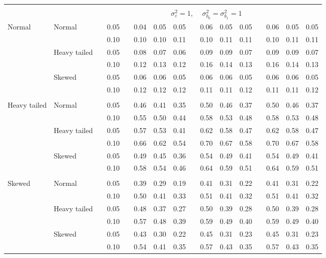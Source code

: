 \documentclass{article} %
\begin{document}
\begin{table}[ht]
\begin{scriptsize}
\begin{center}
\begin{tabular}{ll p{.1cm} c p{.1cm} rrr p{.1cm} rrr p{.1cm} rrr}
&&&&&&&&&&&&&&&\\
& && && \multicolumn{9}{c}{$\sigma_{\varepsilon}^2 = 1$, \ \ $\sigma_{b_0}^2 = \sigma_{b_1}^2 = 1$} \\ \cline{6-16}
\rowcolor{gray!20}Normal       & Normal       && 0.05 &&   0.04 & 0.05 & 0.05 && 0.06 & 0.05 & 0.05 && 0.06 & 0.05 & 0.05 \\ 
\rowcolor{gray!20}             &              && 0.10 &&   0.10 & 0.10 & 0.11 && 0.10 & 0.11 & 0.11 && 0.10 & 0.11 & 0.11 \\ 
\rowcolor{gray!20}             & Heavy tailed && 0.05 &&   0.08 & 0.07 & 0.06 && 0.09 & 0.09 & 0.07 && 0.09 & 0.09 & 0.07 \\ 
\rowcolor{gray!20}             &              && 0.10 &&   0.12 & 0.13 & 0.12 && 0.16 & 0.14 & 0.13 && 0.16 & 0.14 & 0.13 \\ 
\rowcolor{gray!20}             & Skewed       && 0.05 &&   0.06 & 0.06 & 0.05 && 0.06 & 0.06 & 0.05 && 0.06 & 0.06 & 0.05 \\ 
\rowcolor{gray!20}             &              && 0.10 &&   0.12 & 0.12 & 0.12 && 0.11 & 0.11 & 0.12 && 0.11 & 0.11 & 0.12 \\ 
             &&&&&&&&&&&&&&&\\
Heavy tailed & Normal       && 0.05 &&   0.46 & 0.41 & 0.35 && 0.50 & 0.46 & 0.37 && 0.50 & 0.46 & 0.37 \\ 
             &              && 0.10 &&   0.55 & 0.50 & 0.44 && 0.58 & 0.53 & 0.48 && 0.58 & 0.53 & 0.48 \\ 
             & Heavy tailed && 0.05 &&   0.57 & 0.53 & 0.41 && 0.62 & 0.58 & 0.47 && 0.62 & 0.58 & 0.47 \\ 
             &              && 0.10 &&   0.66 & 0.62 & 0.54 && 0.70 & 0.67 & 0.58 && 0.70 & 0.67 & 0.58 \\ 
             & Skewed       && 0.05 &&   0.49 & 0.45 & 0.36 && 0.54 & 0.49 & 0.41 && 0.54 & 0.49 & 0.41 \\ 
             &              && 0.10 &&   0.58 & 0.54 & 0.46 && 0.64 & 0.59 & 0.51 && 0.64 & 0.59 & 0.51 \\
             &&&&&&&&&&&&&&&\\ 
Skewed       & Normal       && 0.05 &&   0.39 & 0.29 & 0.19 && 0.41 & 0.31 & 0.22 && 0.41 & 0.31 & 0.22 \\ 
             &              && 0.10 &&   0.50 & 0.41 & 0.33 && 0.51 & 0.41 & 0.32 && 0.51 & 0.41 & 0.32 \\ 
             & Heavy tailed && 0.05 &&   0.48 & 0.37 & 0.27 && 0.50 & 0.39 & 0.28 && 0.50 & 0.39 & 0.28 \\ 
             &              && 0.10 &&   0.57 & 0.48 & 0.39 && 0.59 & 0.49 & 0.40 && 0.59 & 0.49 & 0.40 \\ 
             & Skewed       && 0.05 &&   0.43 & 0.30 & 0.22 && 0.45 & 0.31 & 0.23 && 0.45 & 0.31 & 0.23 \\ 
             &              && 0.10 &&   0.54 & 0.41 & 0.35 && 0.57 & 0.43 & 0.35 && 0.57 & 0.43 & 0.35 \\ 



\end{tabular}
\end{center}
\end{scriptsize}
\end{table}
\end{document}
